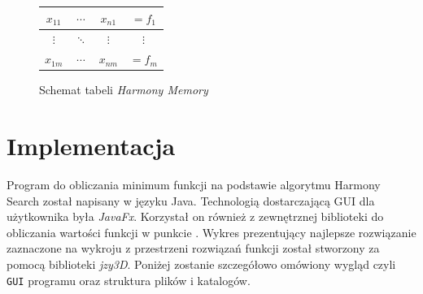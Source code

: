 \documentclass[10pt, a4paper]{article}
\begin{document}
\begin{figure}[h]
\begin{tabular}{|ccc|c|}
	\hline 
	$x_{11}$ & $\cdots$ & $x_{n1}$ & $=f_{1}$\\ 
	\hline 
	$\vdots$ & $\ddots$ & $\vdots$ & $\vdots$\\ 
	\hline 
	$x_{1m}$ & $\cdots$ & $x_{nm}$ & $=f_{m}$\\ 
	\hline 
\end{tabular}
	\centering
	\caption{Schemat tabeli {\em Harmony Memory}}
	\label{tab:1}
\end{figure}

\section{Implementacja}
\label{sec:implementacja}
Program do obliczania minimum funkcji na podstawie algorytmu Harmony Search został napisany w języku Java. Technologią dostarczającą GUI dla użytkownika była {\em JavaFx}. Korzystał on również z zewnętrznej biblioteki do obliczania wartości funkcji w punkcie \cite{bib:mathparser}. Wykres prezentujący najlepsze rozwiązanie zaznaczone na wykroju z przestrzeni rozwiązań funkcji został stworzony za pomocą biblioteki {\em jzy3D}. Poniżej zostanie szczegółowo omówiony wygląd czyli {\tt GUI} programu oraz struktura plików i katalogów.
\end{document}
